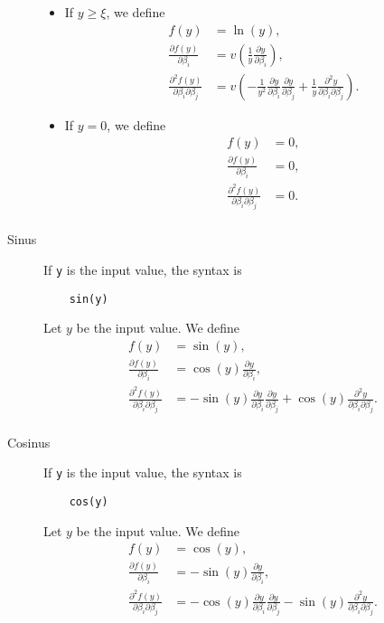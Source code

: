 \documentclass[12pt,a4paper]{article}
\begin{document}
\begin{description}
\begin{itemize}
  \item If $y \geq \xi$, we define
    \begin{align*}
    f(y)& =\ln(y), \\ 
    \frac{\partial f(y)}{\partial \beta_i} &= v\left(\frac{1}{y} \frac{\partial y}{\partial \beta_i}\right), \\
    \frac{\partial^2 f(y)}{\partial \beta_i \partial \beta_j} &=
    v\left(-\frac{1}{y^{2}}
    \frac{\partial y}{\partial \beta_i}
    \frac{\partial y}{\partial \beta_j }
    + \frac{1}{y}
    \frac{\partial^2 y}{\partial \beta_i \partial \beta_j}
      \right).
    \end{align*}
  \item If $y = 0$, we define
    \begin{align*}
      f(y) &= 0, \\
      \frac{\partial f(y)}{\partial \beta_i} &= 0,\\
      \frac{\partial^2 f(y)}{\partial \beta_i\partial \beta_j} &= 0.\\
    \end{align*}
  \end{itemize}



 \item[Sinus] If \lstinline+y+ is the input value, the syntax is
  \begin{lstlisting}
    sin(y)
  \end{lstlisting}
  Let $y$ be the input value. We define
  \begin{align*}
      f(y) &= \sin(y), \\
      \frac{\partial f(y)}{\partial \beta_i} &= \cos(y) \frac{\partial y}{\partial \beta_i},\\
      \frac{\partial^2 f(y)}{\partial \beta_i\partial \beta_j} &= -\sin(y)\frac{\partial y}{\partial \beta_i}\frac{\partial y}{\partial \beta_j} + \cos(y)\frac{\partial^2 y}{\partial \beta_i\partial \beta_j}.\\
  \end{align*}

 \item[Cosinus] If \lstinline+y+ is the input value, the syntax is
  \begin{lstlisting}
    cos(y)
  \end{lstlisting}
  Let $y$ be the input value. We define
  \begin{align*}
      f(y) &= \cos(y), \\
      \frac{\partial f(y)}{\partial \beta_i} &= -\sin(y) \frac{\partial y}{\partial \beta_i},\\
      \frac{\partial^2 f(y)}{\partial \beta_i\partial \beta_j} &= -\cos(y) \frac{\partial y}{\partial \beta_i} \frac{\partial y}{\partial \beta_j}- \sin(y)\frac{\partial^2 y}{\partial \beta_i\partial \beta_j}.\\
  \end{align*}
    

\end{description}
\end{document}
